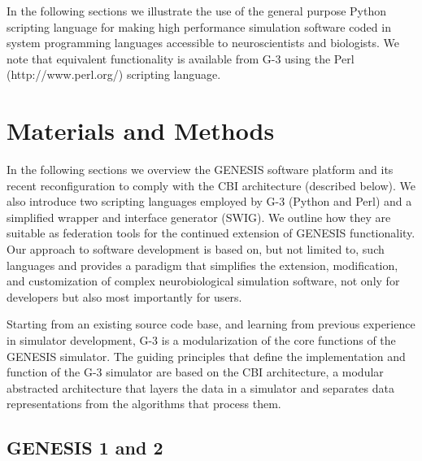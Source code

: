 \documentclass[10pt]{article}
\begin{document}
In the following sections we illustrate the use of the general purpose Python scripting
language for making high performance simulation software coded in
system programming languages accessible to neuroscientists and
biologists. We note that equivalent functionality is available from G-3 using the Perl (http://www.perl.org/) scripting language. 

\section*{Materials and Methods}

In the following sections we overview the GENESIS software platform
and its recent reconfiguration to comply with the CBI architecture
(described below). We also introduce two scripting languages employed
by G-3 (Python and Perl) and a simplified wrapper and interface
generator (SWIG). We outline how they are suitable as federation tools
for the continued extension of GENESIS functionality. Our approach to
software development is based on, but not limited to, such languages
and provides a paradigm that simplifies the extension, modification,
and customization of complex neurobiological simulation software, not
only for developers but also most importantly for users.

Starting from an existing source code base, and learning from
previous experience in simulator development, G-3 is a modularization of the core functions of the GENESIS
simulator.  The guiding principles that define the implementation and
function of the G-3 simulator are based on the CBI
architecture, a modular abstracted architecture
that layers the data in a simulator and separates data
representations from the algorithms that process them.

\subsection*{GENESIS 1 and 2}
\label{sec:genesis}

\end{document}

